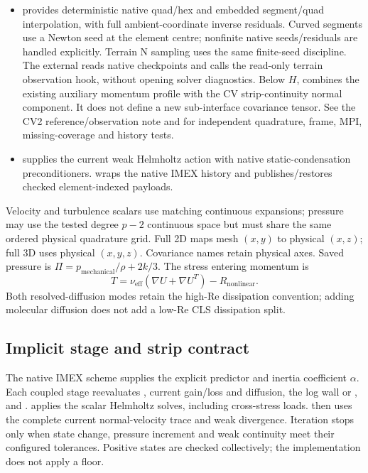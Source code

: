 \begin{itemize}
physical CLS residuals retain the original maximum invariant, while Jacobian
probes select its active generalized derivative.
\item {} provides deterministic native
quad/hex and embedded segment/quad interpolation, with full ambient-coordinate
inverse residuals. Curved segments use a Newton seed at the element centre;
nonfinite native seeds/residuals are handled explicitly. Terrain N sampling
uses the same finite-seed discipline. The external
 reads native checkpoints and calls the read-only
terrain observation hook, without opening solver diagnostics. Below $H$,
 combines the existing auxiliary momentum
profile with the CV strip-continuity normal component. It does not define a
new sub-interface covariance tensor. See the CV2 reference/observation note
and  for independent quadrature, frame,
MPI, missing-coverage and history tests.
\item {} supplies the current weak Helmholtz action with
native static-condensation preconditioners.  wraps the
native IMEX history and publishes/restores checked element-indexed payloads.
\end{itemize}

Velocity and turbulence scalars use matching continuous expansions; pressure
may use the tested degree $p-2$ continuous space but must share the same ordered
physical quadrature grid. Full 2D maps mesh $(x,y)$ to physical $(x,z)$; full 3D
uses physical $(x,y,z)$. Covariance names retain physical axes. Saved pressure
is $\Pi=p_{\mathrm{mechanical}}/\rho+2k/3$. The stress entering momentum is
\[
 T=\nu_{\mathrm{eff}}(\nabla U+\nabla U^T)-R_{\mathrm{nonlinear}}.
\]
Both resolved-diffusion modes retain the high-Re dissipation convention;
adding molecular diffusion does not add a low-Re CLS dissipation split.

\subsection{Implicit stage and strip contract}

The native IMEX scheme supplies the explicit predictor and inertia coefficient
$\alpha$. Each coupled stage reevaluates , current gain/loss and
diffusion, the log wall or , and .
 applies the scalar Helmholtz solves, including cross-stress
loads.  then uses the complete current normal-velocity
trace and weak divergence. Iteration stops only when state change, pressure
increment and weak continuity meet their configured tolerances. Positive
states are checked collectively; the implementation does not apply a floor.

